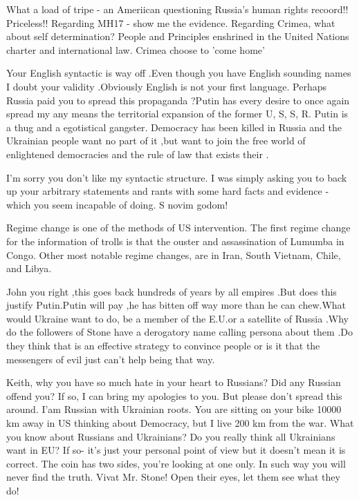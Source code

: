\begin{itemize}
\begin{itemize}

What a load of tripe - an Ameriican questioning Russia's human rights recoord!!
Priceless!! Regarding MH17 - show me the evidence. Regarding Crimea, what about
self determination? People and Principles enshrined in the United Nations
charter and international law. Crimea choose to 'come home'


Your English syntactic is way off .Even though you have English sounding names
I doubt your validity .Obviously English is not your first language. Perhaps
Russia paid you to spread this propaganda ?Putin has every desire to once again
spread my any means the territorial expansion of the former U, S, S, R. Putin is a
thug and a egotistical gangster. Democracy has been killed in Russia and the
Ukrainian people want no part of it ,but want to join the free world of
enlightened democracies and the rule of law that exists their .


I’m sorry you don't like my syntactic structure. I was simply asking you to
back up your arbitrary statements and rants with some hard facts and evidence -
which you seem incapable of doing. S novim godom!


Regime change is one of the methods of US intervention. The first regime change
for the information of trolls is that the ouster and assassination of Lumumba
in Congo. Other most notable regime changes, are in Iran, South Vietnam, Chile,
and Libya.


John you right ,this goes back hundreds of years by all empires .But does this
justify Putin.Putin will pay ,he has bitten off way more than he can chew.What
would Ukraine want to do, be a member of the E.U.or a satellite of Russia .Why
do the followers of Stone have a derogatory name calling persona about them .Do
they think that is an effective strategy to convince people or is it that the
messengers of evil just can't help being that way.


Keith, why you have so much hate in your heart to Russians? Did any Russian
offend you? If so, I can bring my apologies to you. But please don't spread
this around. I'am Russian with Ukrainian roots. You are sitting on your bike
10000 km away in US thinking about Democracy, but I live 200 km from the war.
What you know about Russians and Ukrainians? Do you really think all Ukrainians
want in EU? If so- it's just your personal point of view but it doesn't mean it
is correct. The coin has two sides, you're looking at one only. In such way you
will never find the truth. Vivat Mr. Stone! Open their eyes, let them see what
they do!


\end{itemize}
\end{itemize}
